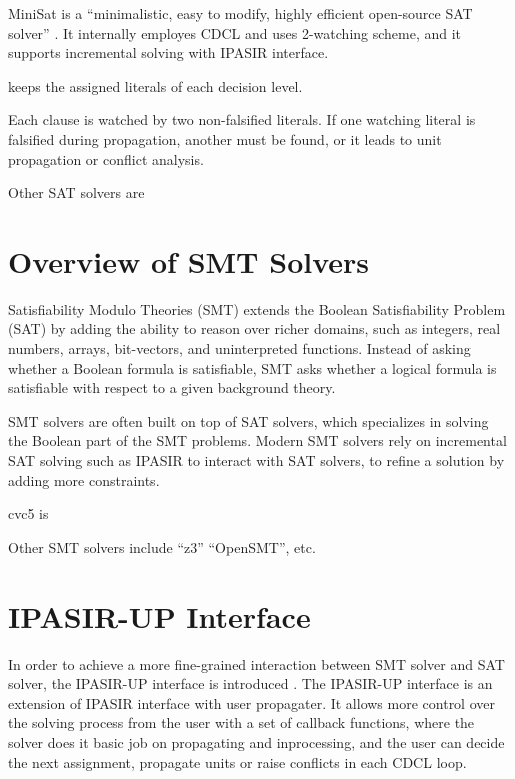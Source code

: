 MiniSat is a ``minimalistic, easy to modify, highly efficient open-source SAT solver'' . It internally employes CDCL and uses 2-watching scheme, and it supports incremental solving with IPASIR interface.

 keeps the assigned literals of each decision level.


Each clause is watched by two non-falsified literals. If one watching literal is falsified during propagation, another must be found, or it leads to unit propagation or conflict analysis.

Other SAT solvers are 

\section{Overview of SMT Solvers}

Satisfiability Modulo Theories (SMT) extends the Boolean Satisfiability Problem (SAT) by adding the ability to reason over richer domains, such as integers, real numbers, arrays, bit-vectors, and uninterpreted functions. Instead of asking whether a Boolean formula is satisfiable, SMT asks whether a logical formula is satisfiable with respect to a given background theory.

SMT solvers are often built on top of SAT solvers, which specializes in solving the Boolean part of the SMT problems. Modern SMT solvers rely on incremental SAT solving such as IPASIR to interact with SAT solvers, to refine a solution by adding more constraints.

cvc5 is 

Other SMT solvers include ``z3'' ``OpenSMT'', etc.

\section{IPASIR-UP Interface}

In order to achieve a more fine-grained interaction between SMT solver and SAT solver, the IPASIR-UP interface is introduced \cite{fazekas_et_al:LIPIcs.SAT.2023.8}. The IPASIR-UP interface is an extension of IPASIR interface with user propagater. It allows more control over the solving process from the user with a set of callback functions, where the solver does it basic job on propagating and inprocessing, and the user can decide the next assignment, propagate units or raise conflicts in each CDCL loop.

